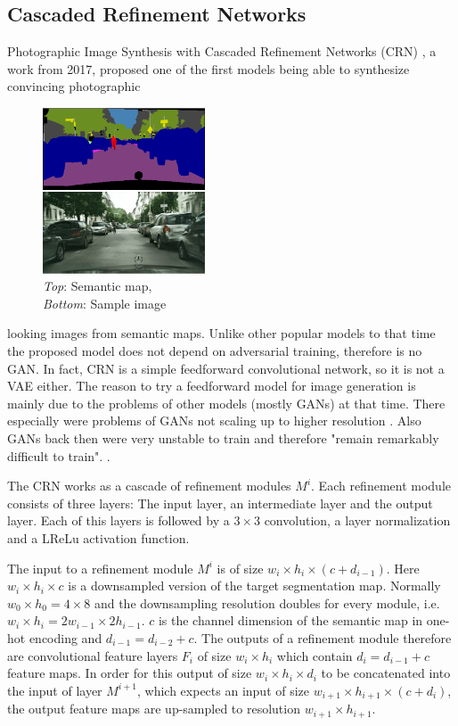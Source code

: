 \subsection{Cascaded Refinement Networks} \label{sec:3.2.1}
Photographic Image Synthesis with Cascaded Refinement Networks (CRN) \cite{crn}, a work from 2017, proposed one of the first models being able to synthesize convincing photographic
%
\begin{figure}
    \begin{center}
        \includegraphics[width=0.43\textwidth]{Chapters/figures/crn_example.PNG}
    \end{center}
    \caption[]{\textit{Top}: Semantic map, \\\textit{Bottom}: Sample image}
\end{figure}
%
looking images from semantic maps. Unlike other popular models to that time the proposed model does not depend on adversarial training, therefore is no GAN. In fact, CRN is a simple feedforward convolutional network, so it is not a VAE either. The reason to try a feedforward model for image generation is mainly due to the problems of other models (mostly GANs) at that time. There especially were problems of GANs not scaling up to higher resolution \cite{crn}. Also GANs back then were very unstable to train and therefore "remain remarkably difficult to train".
\cite{crn}.

The CRN works as a cascade of refinement modules $M^i$. Each refinement module consists of three layers: The input layer, an intermediate layer and the output layer. Each of this layers is followed by a $3\times3$ convolution, a layer normalization and a LReLu activation function. 

The input to a refinement module $M^i$ is of size $w_i\times h_i\times(c + d_{i-1})$. Here $w_i\times h_i\times c$ is a downsampled version of the target segmentation map. Normally $w_0\times h_0=4\times 8$ and the downsampling resolution doubles for every module, i.e. $w_i\times h_i=2w_{i-1}\times2h_{i-1}$. $c$ is the channel dimension of the semantic map in one-hot encoding and $d_{i-1}=d_{i-2}+c$. The outputs of a refinement module therefore are convolutional feature layers $F_i$ of size $w_i\times h_i$ which contain $d_i=d_{i-1}+c$ feature maps. In order for this output of size $w_i\times h_i\times d_i$ to be concatenated into the input of layer $M^{i+1}$, which expects an input of size $w_{i+1}\times h_{i+1}\times (c + d_i)$, the output feature maps are up-sampled to resolution $w_{i+1}\times h_{i+1}$.

